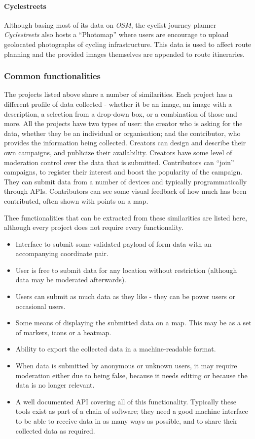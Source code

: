 \documentclass{article}
\begin{document}
		\paragraph{Cyclestreets}
		Although basing most of its data on \emph{OSM}, the cyclist journey planner \emph{Cyclestreets} also hosts a ``Photomap'' where users are encourage to upload geolocated photographs of cycling infrastructure. This data is used to affect route planning and the provided images themselves are appended to route itineraries\cite{_cyclestreets_????}.

		\subsubsection{Common functionalities}
		\label{sec:common-functionalities}

		The projects listed above share a number of similarities. Each project has a different profile of data collected - whether it be an image, an image with a description, a selection from a drop-down box, or a combination of those and more. All the projects have two types of user: the creator who is asking for the data, whether they be an individual or organisation; and the contributor, who provides the information being collected. Creators can design and describe their own campaigns, and publicize their availability. Creators have some level of moderation control over the data that is submitted. Contributors can ``join'' campaigns, to register their interest and boost the popularity of the campaign. They can submit data from a number of devices and typically programmatically through APIs. Contributors can see some visual feedback of how much has been contributed, often shown with points on a map.

		Thee functionalities that can be extracted from these similarities are listed here, although every project does not require every functionality.

		\begin{itemize}
			\item Interface to submit some validated payload of form data with an accompanying coordinate pair.
			\item User is free to submit data for any location without restriction (although data may be moderated afterwards).
			\item Users can submit as much data as they like - they can be power users or occasional users.
			\item Some means of displaying the submitted data on a map. This may be as a set of markers, icons or a heatmap.
			\item Ability to export the collected data in a machine-readable format.
			\item When data is submitted by anonymous or unknown users, it may require moderation either due to being false, because it needs editing or because the data is no longer relevant.
			\item A well documented API covering all of this functionality. Typically these tools exist as part of a chain of software; they need a good machine interface to be able to receive data in as many ways as possible, and to share their collected data as required.
		\end{itemize}
\end{document}
